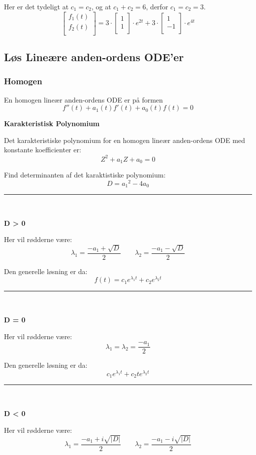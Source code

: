 {Her er det tydeligt at $c_1 = c_2$, og at $c_1 + c_2 = 6$, derfor $c_1 = c_2 = 3$.
\[
\begin{bmatrix}
    f_1(t) \\
    f_2(t) \\
\end{bmatrix}
=
3 \cdot
\begin{bmatrix}
    1 \\
    1 \\
\end{bmatrix}
\cdot e^{2 t}
+ 3 \cdot
\begin{bmatrix}
    1 \\
    -1 \\
\end{bmatrix}
\cdot e^{4 t}
\]
}


\newpage

\subsection{Løs Lineære anden-ordens ODE'er}
\subsubsection{Homogen}
En homogen lineær anden-ordens ODE er på formen
\[
f''(t) + a_1(t) f'(t) + a_0(t) f(t) = 0
\]

\textbf{Karakteristisk Polynomium}

Det karakteristiske polynomium for en homogen lineær anden-ordens ODE med konstante koefficienter er:
\[
Z^2 + a_1 Z + a_0 = 0
\]

Find determinanten af det karaktistiske polynomium:
\[
D = {a_1}^2 - 4 a_0
\]

\hrule
\

\textbf{D > 0}

Her vil rødderne være:
\[
\lambda_1 = \frac{-a_1 + \sqrt{D}}{2} \qquad \lambda_2 = \frac{-a_1 - \sqrt{D}}{2}
\] 

Den generelle løsning er da:
\[
f(t) = c_1 e^{\lambda_1 t} + c_2 e^{\lambda_2 t}
\]

\hrule
\

\textbf{D = 0}

Her vil rødderne være:
\[
\lambda_1 = \lambda_2 = \frac{-a_1}{2}
\]

Den generelle løsning er da:
\[
c_1 e^{\lambda_1 t} + c_2 t e^{\lambda_2 t} 
\]

\hrule
\

\textbf{D < 0} 

Her vil rødderne være:
\[
\lambda_1 = \frac{-a_1 + i \sqrt{|D|}}{2} \qquad \lambda_2 = \frac{-a_1 - i \sqrt{|D|}}{2}
\]

